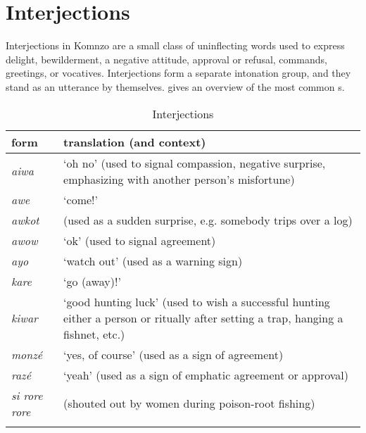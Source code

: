 \section{Interjections} \label{interjections-sec}

Interjections in Komnzo are a small class of uninflecting words used to express delight, bewilderment, a negative attitude, approval or refusal, commands, greetings, or vocatives. Interjections form a separate intonation group, and they stand as an utterance by themselves.  gives an overview of the most common s.

\begin{table}
\caption{Interjections}
\label{interjections-table}
	\begin{tabularx}{\textwidth}{Xp{}}
		\lsptoprule
		{form}&{translation (and context)}\\\midrule
		\emph{aiwa}&`oh no' (used to signal compassion, negative surprise, emphasizing with another person's misfortune)\\
		\emph{awe}&`come!'\\
		\emph{awkot}& (used as a sudden surprise, e.g. somebody trips over a log)\\
		\emph{awow}&`ok' (used to signal agreement)\\
		\emph{ayo}&`watch out' (used as a warning sign)\\
		\emph{kare}&`go (away)!'\\
		\emph{kiwar}&`good hunting luck' (used to wish a successful hunting either a person or ritually after setting a trap, hanging a fishnet, etc.)\\
		\emph{monzé}&`yes, of course' (used as a sign of agreement)\\
		\emph{razé}&`yeah' (used as a sign of emphatic agreement or approval)\\
		\emph{si rore rore}& (shouted out by women during poison-root fishing)\\
		\lspbottomrule
	\end{tabularx}
\end{table}%